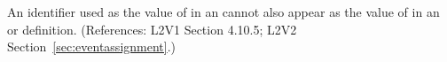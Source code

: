 An identifier used as the value of  in an \EventAssignment
cannot also appear as the value of  in an \AssignmentRule
or \RateRule definition.  (References: L2V1 Section 4.10.5; L2V2
Section~\ref{sec:eventassignment}.)
